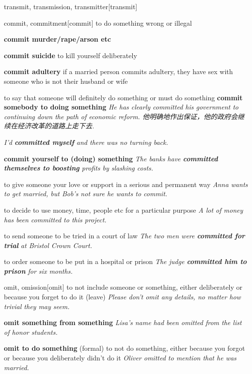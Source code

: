 \begin{DefWord}{transmit, transmission, transmitter}[transmit]
\end{DefWord}

\begin{DefWord}{commit, commitment}[commit]
    to do something wrong or illegal

    \textbf{commit murder/rape/arson etc}

    \textbf{commit suicide} to kill yourself deliberately

    \textbf{commit adultery} if a married person commits adultery, they have sex with someone who is not their husband or wife

    to say that someone will definitely do something or must do something
    \textbf{commit somebody to doing something}
    \textit{He has clearly committed his government to continuing down the path of economic reform. 他明确地作出保证，他的政府会继续在经济改革的道路上走下去. }

    \textit{I'd \textbf{committed myself} and there was no turning back.}

    \textbf{commit yourself to (doing) something} 
    \textit{The banks have \textbf{committed themselves to boosting} profits by slashing costs.}

    to give someone your love or support in a serious and permanent way
    \textit{Anna wants to get married, but Bob's not sure he wants to commit.}

    to decide to use money, time, people etc for a particular purpose
    \textit{A lot of money has been committed to this project.}

    to send someone to be tried in a court of law
    \textit{The two men were \textbf{committed for trial} at Bristol Crown Court.}

    to order someone to be put in a hospital or prison
    \textit{The judge \textbf{committed him to prison} for six months.}
\end{DefWord}

\begin{DefWord}{omit, omission}[omit]
    to not include someone or something, either deliberately or because you forget to do it (leave)
    \textit{Please don't omit any details, no matter how trivial they may seem.}

    \textbf{omit something from something}
    \textit{Lisa's name had been omitted from the list of honor students.}

    \textbf{omit to do something} (formal) to not do something, either because you forgot or because you deliberately didn't do it
    \textit{Oliver omitted to mention that he was married.}
\end{DefWord}

